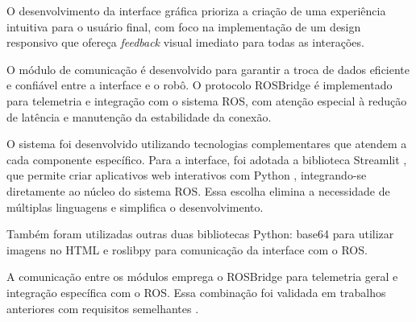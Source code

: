 

O desenvolvimento da interface gráfica prioriza a criação de uma experiência intuitiva para o usuário final, com foco na implementação de um design responsivo que ofereça \textit{feedback} visual imediato para todas as interações. 

O módulo de comunicação é desenvolvido para garantir a troca de dados eficiente e confiável entre a interface e o robô. O protocolo ROSBridge é implementado para telemetria e integração com o sistema ROS, com atenção especial à redução de latência e manutenção da estabilidade da conexão.



O sistema foi desenvolvido utilizando tecnologias complementares que atendem a cada componente específico. Para a interface, foi adotada a biblioteca Streamlit \cite{Streamlit}, que permite criar aplicativos web interativos com Python \cite{python3}, integrando-se diretamente ao núcleo do sistema ROS. Essa escolha elimina a necessidade de múltiplas linguagens e simplifica o desenvolvimento.

Também foram utilizadas outras duas bibliotecas Python: base64 para utilizar imagens no HTML e roslibpy\cite{ROSBridge} para comunicação da interface com o ROS.

A comunicação entre os módulos emprega o ROSBridge para telemetria geral e integração específica com o ROS. Essa combinação foi validada em trabalhos anteriores com requisitos semelhantes \cite{Teleoperacao}.

